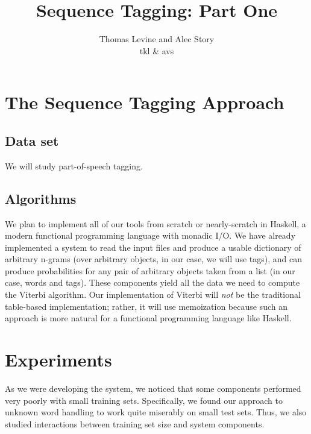 \documentclass{article}
\title{Sequence Tagging: Part One}
\author{Thomas Levine and Alec Story\\\small{tkl\osn{22} \& avs\osn{38}}}
\begin{document}
\maketitle

\section{The Sequence Tagging Approach}


\subsection{Data set}
We will study part-of-speech tagging.
\subsection{Algorithms}
We plan to implement all of our tools from scratch or nearly-scratch in Haskell,
a modern functional programming language with monadic I/O.  We have already
implemented a system to read the input files and produce a usable dictionary of
arbitrary n-grams (over arbitrary objects, in our case, we will use tags), and
can produce probabilities for any pair of arbitrary objects taken from a list
(in our case, words and tags).  These components yield all the data we need to
compute the Viterbi algorithm.  Our implementation of Viterbi will \emph{not} be
the traditional table-based implementation; rather, it will use memoization
because such an approach is more natural for a functional programming language
like Haskell.



\section{Experiments}

As we were developing the system, we noticed that some components performed
very poorly with small training sets. Specifically, we found our approach to
unknown word handling to work quite miserably on small test sets. Thus,
we also studied interactions between training set size and system components.
\end{document}
